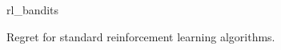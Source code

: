 \begin{figure}
    \centering
    \newcommand{\myoptions}{
        width=10cm,
        height=8cm,
        xlabel={Turn},
        ylabel={Regret},
        legend entries={A2C, DQN, PPO, QNN},
        legend pos=north west,
        legend cell align=left,
        mystyle,
        largexnumbers,
    }
    {rl_bandits}
    \caption{
        Regret for standard reinforcement learning algorithms.
    }
    \label{fig:rl_bandits}
\end{figure}